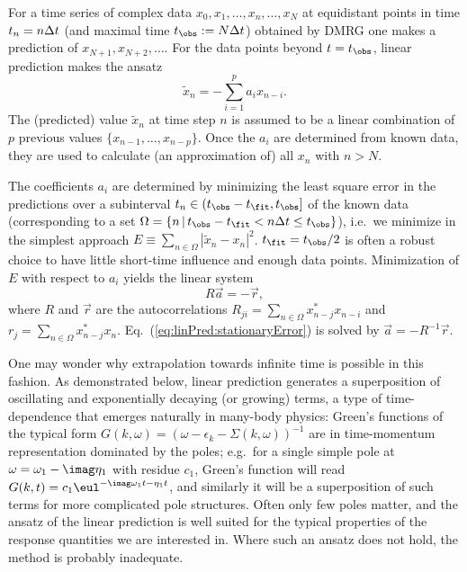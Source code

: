 For a time series of complex data $x_0, x_1, \ldots, x_n, \ldots, x_N$ at equidistant points in time $t_n=n\*\Delta t$ (and maximal time $t_\obs:= N \Delta t$) obtained by DMRG one makes a prediction of $x_{N+1}, x_{N+2}, \ldots$. 
For the data points beyond $t=t_\obs$, linear prediction makes the ansatz
\begin{equation}\label{eq:predictionAnsatz}
\tilde{x}_n = - \sum_{i=1}^p a_i x_{n-i} .
\end{equation}
The (predicted) value $\tilde{x}_n$ at time step $n$ is assumed to be a linear combination of $p$ previous values $\{x_{n-1},\dots,x_{n-p}\}$. Once the $a_i$ are determined from known data, they are used to calculate (an approximation of) all $x_n$ with $n>N$.

The coefficients $a_i$ are determined by minimizing the least square error in the predictions over a subinterval $t_n \in (t_\obs-t_\fit,t_\obs]$ of the known data (corresponding to a set $\Omega = \{ n\, |\, t_\obs - t_\fit < n\Delta t \leq t_\obs \}$), i.e.\ we minimize in the simplest approach $E\equiv\sum_{n\in\Omega} |\tilde x_n-x_n|^2$. $t_\fit=t_\obs/2$ is often a robust choice to have little short-time influence and enough data points. Minimization of $E$ with respect to $a_i$ yields the linear system
\begin{equation}
\label{eq:linPred:stationaryError}
R \vec{a} = -\vec{r},
\end{equation}
where $R$ and $\vec{r}$ are the autocorrelations 
$R_{ji} = \sum_{n\in\Omega} x^*_{n-j} x_{n-i}$ and $r_{j} = \sum_{n\in\Omega} x^*_{n-j} x_n$.
Eq.~(\ref{eq:linPred:stationaryError}) is solved by $\vec{a}=-R^{-1}\vec{r}$.

One may wonder why extrapolation towards infinite time is possible in this fashion. 
As demonstrated below, linear prediction generates a superposition of oscillating and exponentially decaying (or growing) terms, a type of time-dependence that emerges naturally in many-body physics:
Green's functions of the typical form $G(k,\omega) = (\omega - \epsilon_k - \Sigma(k,\omega))^{-1}$ are in time-momentum representation dominated by the poles; e.g.\ for a single simple pole at $\omega=\omega_1 -\imag \eta_1$ with residue $c_1$, Green's function will read
$G(k,t) = c_1 \eul^{-\imag \omega_1 t - \eta_1 t}$, and similarly it will be a superposition of such terms for more complicated pole structures. Often only few poles matter, and the ansatz of the linear prediction is well suited for the typical properties of the response quantities we are interested in. Where such an ansatz does not hold, the method is probably inadequate.

